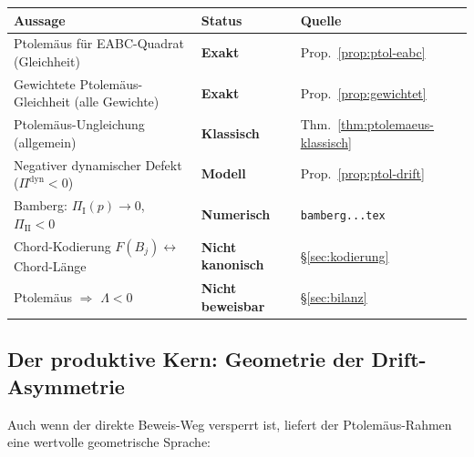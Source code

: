 \documentclass[12pt,a4paper]{article}
\newcommand{\Ptol}{\Pi}             %
\begin{document}
\begin{center}
\renewcommand{\arraystretch}{1.5}
\begin{tabular}{p{7.5cm} p{2.5cm} p{3.5cm}}
\toprule
\textbf{Aussage} & \textbf{Status} & \textbf{Quelle} \\
\midrule
Ptolemäus für EABC-Quadrat (Gleichheit)
  & \textcolor{bewiesengrün}{\bfseries Exakt}
  & Prop.~\ref{prop:ptol-eabc} \\
Gewichtete Ptolemäus-Gleichheit (alle Gewichte)
  & \textcolor{bewiesengrün}{\bfseries Exakt}
  & Prop.~\ref{prop:gewichtet} \\
Ptolemäus-Ungleichung (allgemein)
  & \textcolor{bewiesengrün}{\bfseries Klassisch}
  & Thm.~\ref{thm:ptolemaeus-klassisch} \\
Negativer dynamischer Defekt ($\Ptol^{\mathrm{dyn}} < 0$)
  & \textcolor{warnorange}{\bfseries Modell}
  & Prop.~\ref{prop:ptol-drift} \\
Bamberg: $\Ptol_{\mathrm I}(p) \to 0$, $\Ptol_{\mathrm{II}} < 0$
  & \textcolor{warnorange}{\bfseries Numerisch}
  & \texttt{bamberg...tex} \\
\midrule
Chord-Kodierung $F(B_j) \leftrightarrow$ Chord-Länge
  & \textcolor{lückenrot}{\bfseries Nicht kanonisch}
  & §\ref{sec:kodierung} \\
Ptolemäus $\Rightarrow$ $\Lambda < 0$
  & \textcolor{lückenrot}{\bfseries Nicht beweisbar}
  & §\ref{sec:bilanz} \\
\bottomrule
\end{tabular}
\end{center}

\subsection{Der produktive Kern: Geometrie der Drift-Asymmetrie}

Auch wenn der direkte Beweis-Weg versperrt ist, liefert der Ptolemäus-Rahmen
eine wertvolle geometrische Sprache:
\end{document}
